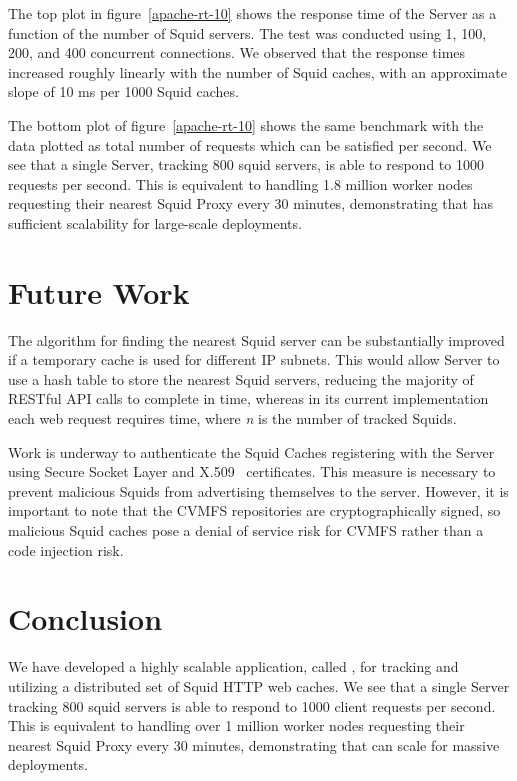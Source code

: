\documentclass[a4paper]{jpconf}
\begin{document}
The top plot in figure~\ref{apache-rt-10} shows the response time of the \shoal Server 
as a function of the number of Squid servers. 
The test was conducted using 1, 100, 200, and 400 concurrent connections. 
We observed that the response times increased roughly linearly with the number of Squid caches, 
with an approximate slope of 10 ms per 1000 Squid caches. 

The bottom plot of figure~\ref{apache-rt-10} shows the same benchmark with the data 
plotted as total number of requests which can be satisfied per second. 
We see that a single \shoal Server, tracking 800 squid servers, is able to respond 
to 1000 requests per second. 
This is equivalent to handling 1.8 million worker nodes requesting their nearest Squid 
Proxy every 30 minutes, demonstrating that \shoal has sufficient scalability for large-scale 
deployments.


\section{Future Work}
The algorithm for finding the nearest Squid server can be substantially improved if a 
temporary cache is used for different IP subnets. 
This would allow \shoal Server to use a hash table to store the nearest Squid servers, reducing 
the majority of RESTful API calls to complete in  time, whereas in its current 
implementation each web request requires  time, where \textit{n} is the 
number of tracked Squids. 

Work is underway to authenticate the Squid Caches registering with the \shoal Server 
using Secure Socket Layer and X.509~\cite{ref:rfc3820} certificates. 
This measure is necessary to prevent malicious Squids from advertising themselves to the 
\shoal server. 
However, it is important to note that the CVMFS repositories are cryptographically signed, 
so malicious Squid caches pose a denial of service risk for CVMFS rather than a 
code injection risk.

\pagebreak
\section{Conclusion}
We have developed a highly scalable application, called \shoal, for tracking and utilizing 
a distributed set of Squid HTTP web caches.
We see that a single \shoal Server tracking 800 squid servers is able to respond to 1000 
client requests per second. 
This is equivalent to handling over 1 million worker nodes requesting their nearest 
Squid Proxy every 30 minutes, demonstrating that \shoal can scale for massive deployments.
\end{document}
